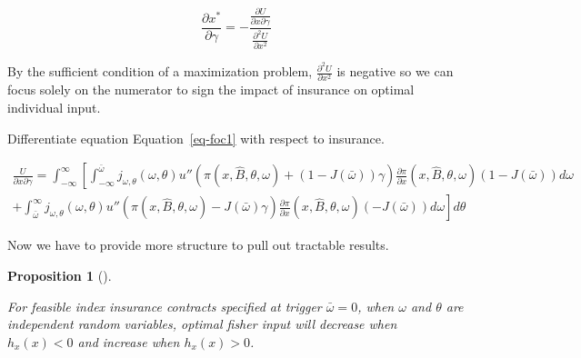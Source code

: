 \documentclass[
  letterpaper,
  DIV=11,
  numbers=noendperiod]{scrartcl}
\theoremstyle{plain}
\newtheorem{proposition}{Proposition}[section]
\theoremstyle{plain}
\theoremstyle{remark}
\begin{document}
\[
\frac{\partial x^{*}}{\partial \gamma}=-\frac{\frac{\partial U}{\partial x \partial \gamma}}{\frac{\partial^2 U}{\partial x^{2}}}
\]

By the sufficient condition of a maximization problem,
\(\frac{\partial^2 U}{\partial x^{2}}\) is negative so we can focus
solely on the numerator to sign the impact of insurance on optimal
individual input.

Differentiate equation Equation~\ref{eq-foc1} with respect to insurance.

\[
\begin{aligned}
\frac{U}{\partial x \partial \gamma}=\int^{\infty}_{-\infty}\left[ \int^{\bar\omega}_{-\infty}j_{\omega,\theta}(\omega,\theta)u''(\pi(x,\hat{B},\theta,\omega)+(1-J(\bar\omega))\gamma)\frac{\partial \pi}{\partial x}(x,\hat{B},\theta,\omega)(1-J(\bar\omega))d\omega\right.\\
+\left.\int^{\infty}_{\bar{\omega}}j_{\omega,\theta}(\omega,\theta) u''(\pi(x,\hat{B},\theta,\omega)-J(\bar\omega)\gamma)\frac{\partial \pi}{\partial x}(x,\hat{B},\theta,\omega)(-J(\bar\omega))d\omega\right] d\theta
\end{aligned}
\]

Now we have to provide more structure to pull out tractable results.

\begin{proposition}[]\protect\hypertarget{prp-ind}{}\label{prp-ind}

For feasible index insurance contracts specified at trigger
\(\bar\omega=0\), when \(\omega\) and \(\theta\) are independent random
variables, optimal fisher input will decrease when \(h_x(x)<0\) and
increase when \(h_x(x)>0\).

\end{proposition}
\end{document}
